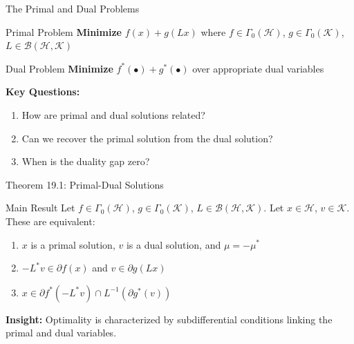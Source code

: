 \documentclass[aspectratio=169,10pt]{beamer}
\begin{document}
\begin{frame}{The Primal and Dual Problems}
    \begin{block}{Primal Problem}
        \textbf{Minimize} $f(x) + g(Lx)$ where $f \in \Gamma_0(\mathcal{H})$, $g \in \Gamma_0(\mathcal{K})$, $L \in \mathcal{B}(\mathcal{H}, \mathcal{K})$
    \end{block}

    \begin{block}{Dual Problem}
        \textbf{Minimize} $f^*(\bullet) + g^*(\bullet)$ over appropriate dual variables
    \end{block}

    \vspace{8pt}

    \textbf{Key Questions:}
    \begin{enumerate}
        \item How are primal and dual solutions related?
        \item Can we recover the primal solution from the dual solution?
        \item When is the duality gap zero?
    \end{enumerate}
\end{frame}

\begin{frame}{Theorem 19.1: Primal-Dual Solutions}
    \begin{block}{Main Result}
        Let $f \in \Gamma_0(\mathcal{H})$, $g \in \Gamma_0(\mathcal{K})$, $L \in \mathcal{B}(\mathcal{H}, \mathcal{K})$.
        Let $x \in \mathcal{H}$, $v \in \mathcal{K}$. These are equivalent:
        \begin{enumerate}
            \item $x$ is a primal solution, $v$ is a dual solution, and $\mu = -\mu^*$
            \item $-L^* v \in \partial f(x)$ and $v \in \partial g(Lx)$
            \item $x \in \partial f^*(-L^* v) \cap L^{-1}(\partial g^*(v))$
        \end{enumerate}
    \end{block}

    \vspace{8pt}

    \textbf{Insight:} Optimality is characterized by subdifferential conditions linking the primal and dual variables.
\end{frame}
\end{document}
